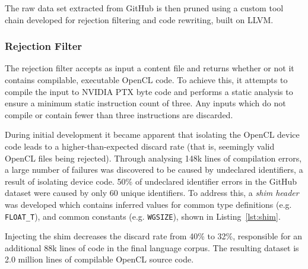The raw data set extracted from GitHub is then pruned using a custom tool chain developed for rejection filtering and code rewriting, built on LLVM.


\subsubsection{Rejection Filter}
\label{subsubsec:opencl-rejection-filter} The rejection filter accepts as input a content file and returns whether or not it contains compilable, executable OpenCL code. To achieve this, it attempts to compile the input to NVIDIA PTX byte code and performs a static analysis to ensure a minimum static instruction count of three. Any inputs which do not compile or contain fewer than three instructions are discarded.

During initial development it became apparent that isolating the OpenCL device code leads to a higher-than-expected discard rate (that is, seemingly valid OpenCL files being rejected). Through analysing 148k lines of compilation errors, a large number of failures was discovered to be caused by undeclared identifiers, a result of isolating device code. 50\% of undeclared identifier errors in the GitHub dataset were caused by only 60 unique identifiers. To address this, a \emph{shim header} was developed which contains inferred values for common type definitions (e.g. \texttt{FLOAT\_T}), and common constants (e.g. \texttt{WGSIZE}), shown in Listing~\ref{lst:shim}.

Injecting the shim decreases the discard rate from 40\% to 32\%, responsible for an additional 88k lines of code in the final language corpus. The resulting dataset is 2.0 million lines of compilable OpenCL source code.

